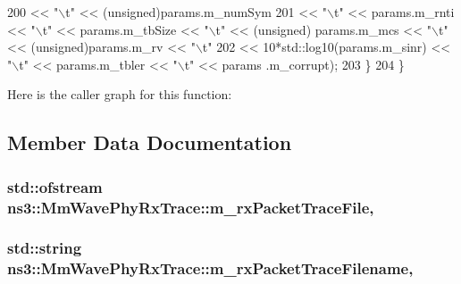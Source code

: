 \begin{DoxyCode}
200                     << \textcolor{stringliteral}{"\(\backslash\)t"} << (\textcolor{keywordtype}{unsigned})params.m\_numSym
201                                 << \textcolor{stringliteral}{"\(\backslash\)t"} << params.m\_rnti << \textcolor{stringliteral}{"\(\backslash\)t"} << params.m\_tbSize << \textcolor{stringliteral}{"\(\backslash\)t"} << (\textcolor{keywordtype}{unsigned})
      params.m\_mcs << \textcolor{stringliteral}{"\(\backslash\)t"} << (\textcolor{keywordtype}{unsigned})params.m\_rv << \textcolor{stringliteral}{"\(\backslash\)t"}
202                                 << 10*std::log10(params.m\_sinr) << \textcolor{stringliteral}{"\(\backslash\)t"} << params.m\_tbler << \textcolor{stringliteral}{"\(\backslash\)t"} << params
      .m\_corrupt);
203         \}
204 \}
\end{DoxyCode}


Here is the caller graph for this function\+:




\subsection{Member Data Documentation}
\subsubsection[{\texorpdfstring{m\+\_\+rx\+Packet\+Trace\+File}{m_rxPacketTraceFile}}]{\setlength{\rightskip}{0pt plus 5cm}std\+::ofstream ns3\+::\+Mm\+Wave\+Phy\+Rx\+Trace\+::m\+\_\+rx\+Packet\+Trace\+File\hspace{0.3cm}{\ttfamily [static]}, {\ttfamily [private]}}\hypertarget{classns3_1_1MmWavePhyRxTrace_a07034985924a2a3d7f94264c374d89b0}{}\label{classns3_1_1MmWavePhyRxTrace_a07034985924a2a3d7f94264c374d89b0}
\subsubsection[{\texorpdfstring{m\+\_\+rx\+Packet\+Trace\+Filename}{m_rxPacketTraceFilename}}]{\setlength{\rightskip}{0pt plus 5cm}std\+::string ns3\+::\+Mm\+Wave\+Phy\+Rx\+Trace\+::m\+\_\+rx\+Packet\+Trace\+Filename\hspace{0.3cm}{\ttfamily [static]}, {\ttfamily [private]}}\hypertarget{classns3_1_1MmWavePhyRxTrace_a77b3807d28e4e1e7422c2e15da797ee5}{}\label{classns3_1_1MmWavePhyRxTrace_a77b3807d28e4e1e7422c2e15da797ee5}


